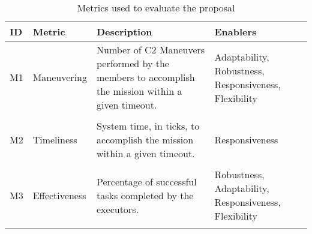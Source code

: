 \begin{table}[ht!]
	\small
	\fontsize{10}{10}\selectfont
	\centering
	\caption{Metrics used to evaluate the proposal}
	\label{table:metrics}
	
	\begin{tabularx}{\textwidth}{llXX}
	\hline
		\textbf{ID}
		& \textbf{Metric}
		& \textbf{Description}
		& \textbf{Enablers} \\ [1ex]
	\hline	
	
	M1 & Maneuvering & Number of C2 Maneuvers performed by the members to accomplish the mission within a given timeout. & Adaptability, Robustness, Responsiveness, Flexibility
	\\[1ex] \\
	
	M2 & Timeliness & System time, in ticks, to accomplish the mission within a given timeout. & Responsiveness
	\\[1ex] \\
	
	M3 & Effectiveness &  Percentage of successful tasks completed by the executors. & Robustness, Adaptability, Responsiveness, Flexibility
	\\[1ex] \\
	\hline
	\end{tabularx}
\end{table} 
